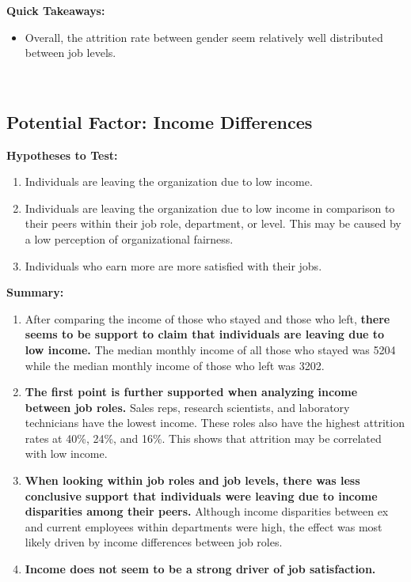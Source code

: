 \documentclass[
]{article}
\providecommand{\tightlist}{%
  \setlength{\itemsep}{0pt}\setlength{\parskip}{0pt}}
\begin{document}
\textbf{Quick Takeaways:}

\begin{itemize}
\tightlist
\item
  Overall, the attrition rate between gender seem relatively well
  distributed between job levels.
\end{itemize}

~ ~

\hypertarget{potential-factor-income-differences}{%
\subsection{Potential Factor: Income
Differences}\label{potential-factor-income-differences}}

\textbf{Hypotheses to Test:}

\begin{enumerate}
\def\labelenumi{\arabic{enumi}.}
\tightlist
\item
  Individuals are leaving the organization due to low income.
\item
  Individuals are leaving the organization due to low income in
  comparison to their peers within their job role, department, or level.
  This may be caused by a low perception of organizational fairness.
\item
  Individuals who earn more are more satisfied with their jobs.
\end{enumerate}

\textbf{Summary:}

\begin{enumerate}
\def\labelenumi{\arabic{enumi}.}
\tightlist
\item
  After comparing the income of those who stayed and those who left,
  \textbf{there seems to be support to claim that individuals are
  leaving due to low income.} The median monthly income of all those who
  stayed was 5204 while the median monthly income of those who left was
  3202.
\item
  \textbf{The first point is further supported when analyzing income
  between job roles.} Sales reps, research scientists, and laboratory
  technicians have the lowest income. These roles also have the highest
  attrition rates at 40\%, 24\%, and 16\%. This shows that attrition may
  be correlated with low income.
\item
  \textbf{When looking within job roles and job levels, there was less
  conclusive support that individuals were leaving due to income
  disparities among their peers.} Although income disparities between ex
  and current employees within departments were high, the effect was
  most likely driven by income differences between job roles.
\item
  \textbf{Income does not seem to be a strong driver of job
  satisfaction.}
\end{enumerate}
\end{document}

